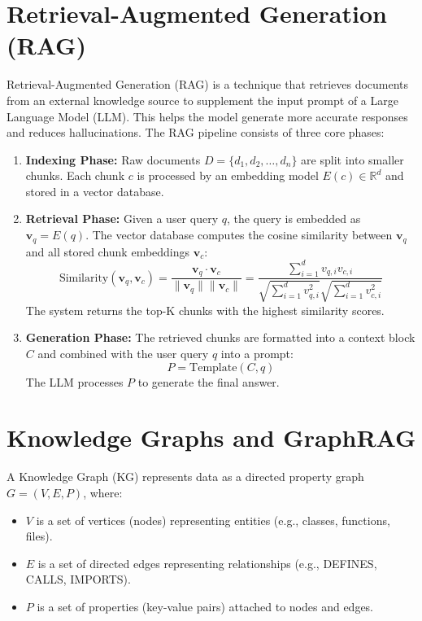 \documentclass[12pt,a4paper,oneside]{report}
\begin{document}
\section{Retrieval-Augmented Generation (RAG)}
Retrieval-Augmented Generation (RAG) is a technique that retrieves documents from an external knowledge source to supplement the input prompt of a Large Language Model (LLM). This helps the model generate more accurate responses and reduces hallucinations. The RAG pipeline consists of three core phases:
\begin{enumerate}
    \item \textbf{Indexing Phase:} Raw documents $D = \{d_1, d_2, \dots, d_n\}$ are split into smaller chunks. Each chunk $c$ is processed by an embedding model $E(c) \in \mathbb{R}^d$ and stored in a vector database.
    \item \textbf{Retrieval Phase:} Given a user query $q$, the query is embedded as $\mathbf{v}_q = E(q)$. The vector database computes the cosine similarity between $\mathbf{v}_q$ and all stored chunk embeddings $\mathbf{v}_c$:
    \begin{equation}
        \text{Similarity}(\mathbf{v}_q, \mathbf{v}_c) = \frac{\mathbf{v}_q \cdot \mathbf{v}_c}{\|\mathbf{v}_q\| \|\mathbf{v}_c\|} = \frac{\sum_{i=1}^d v_{q,i} v_{c,i}}{\sqrt{\sum_{i=1}^d v_{q,i}^2} \sqrt{\sum_{i=1}^d v_{c,i}^2}}
    \end{equation}
    The system returns the top-K chunks with the highest similarity scores.
    \item \textbf{Generation Phase:} The retrieved chunks are formatted into a context block $C$ and combined with the user query $q$ into a prompt:
    \begin{equation}
        P = \text{Template}(C, q)
    \end{equation}
    The LLM processes $P$ to generate the final answer.
\end{enumerate}

\section{Knowledge Graphs and GraphRAG}
A Knowledge Graph (KG) represents data as a directed property graph $G = (V, E, P)$, where:
\begin{itemize}
    \item $V$ is a set of vertices (nodes) representing entities (e.g., classes, functions, files).
    \item $E$ is a set of directed edges representing relationships (e.g., DEFINES, CALLS, IMPORTS).
    \item $P$ is a set of properties (key-value pairs) attached to nodes and edges.
\end{itemize}
\end{document}
